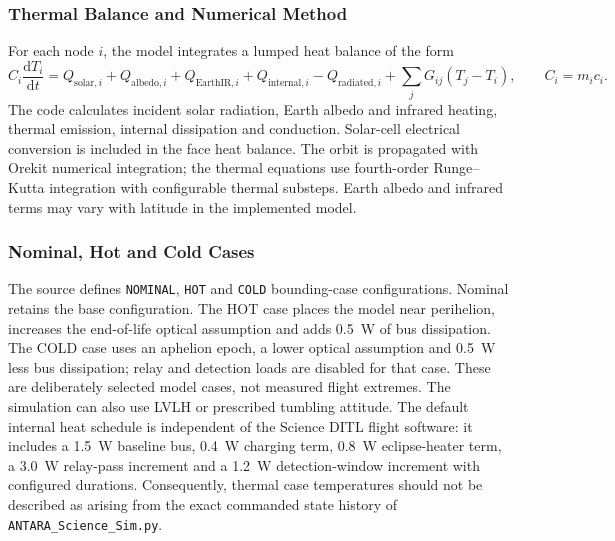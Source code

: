 \subsubsection{Thermal Balance and Numerical Method}\label{app:thermal-equations}
For each node $i$, the model integrates a lumped heat balance of the form
\begin{equation}\label{eq:thermal-balance}
C_i\frac{\mathrm{d}T_i}{\mathrm{d}t}=Q_{\mathrm{solar},i}+Q_{\mathrm{albedo},i}+Q_{\mathrm{EarthIR},i}+Q_{\mathrm{internal},i}-Q_{\mathrm{radiated},i}+\sum_j G_{ij}(T_j-T_i),\qquad C_i=m_ic_i.
\end{equation}
The code calculates incident solar radiation, Earth albedo and infrared heating, thermal emission, internal dissipation and conduction. Solar-cell electrical conversion is included in the face heat balance. The orbit is propagated with Orekit numerical integration; the thermal equations use fourth-order Runge--Kutta integration with configurable thermal substeps. Earth albedo and infrared terms may vary with latitude in the implemented model.
\subsubsection{Nominal, Hot and Cold Cases}\label{app:thermal-cases}
The source defines \texttt{NOMINAL}, \texttt{HOT} and \texttt{COLD} bounding-case configurations. Nominal retains the base configuration. The HOT case places the model near perihelion, increases the end-of-life optical assumption and adds 0.5~W of bus dissipation. The COLD case uses an aphelion epoch, a lower optical assumption and 0.5~W less bus dissipation; relay and detection loads are disabled for that case. These are deliberately selected model cases, not measured flight extremes. The simulation can also use LVLH or prescribed tumbling attitude.
The default internal heat schedule is independent of the Science DITL flight software: it includes a 1.5~W baseline bus, 0.4~W charging term, 0.8~W eclipse-heater term, a 3.0~W relay-pass increment and a 1.2~W detection-window increment with configured durations. Consequently, thermal case temperatures should not be described as arising from the exact commanded state history of \texttt{ANTARA\_Science\_Sim.py}.

